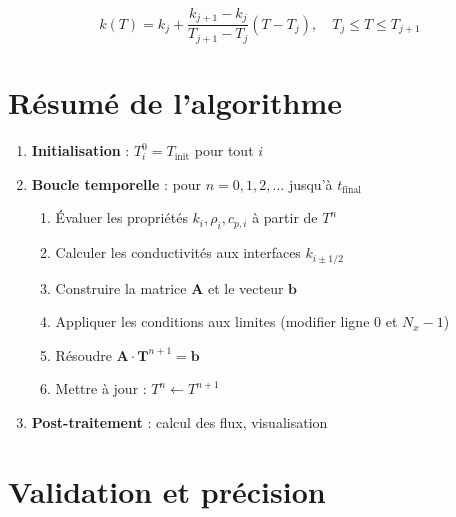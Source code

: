 \documentclass[11pt,a4paper]{article}
\begin{document}
\begin{equation}
k(T) = k_j + \frac{k_{j+1} - k_j}{T_{j+1} - T_j}(T - T_j), \quad T_j \leq T \leq T_{j+1}
\end{equation}

\section{Résumé de l'algorithme}

\begin{tcolorbox}[colback=gray!5,colframe=gray!50!black,title=\textbf{Algorithme de résolution}]
\begin{enumerate}
    \item \textbf{Initialisation} : $T_i^0 = T_{\text{init}}$ pour tout $i$
    
    \item \textbf{Boucle temporelle} : pour $n = 0, 1, 2, \ldots$ jusqu'à $t_{\text{final}}$
    \begin{enumerate}
        \item Évaluer les propriétés $k_i, \rho_i, c_{p,i}$ à partir de $T^n$
        \item Calculer les conductivités aux interfaces $k_{i\pm 1/2}$
        \item Construire la matrice $\mathbf{A}$ et le vecteur $\mathbf{b}$
        \item Appliquer les conditions aux limites (modifier ligne 0 et $N_x-1$)
        \item Résoudre $\mathbf{A} \cdot \mathbf{T}^{n+1} = \mathbf{b}$
        \item Mettre à jour : $T^n \leftarrow T^{n+1}$
    \end{enumerate}
    
    \item \textbf{Post-traitement} : calcul des flux, visualisation
\end{enumerate}
\end{tcolorbox}

\section{Validation et précision}
\end{document}
